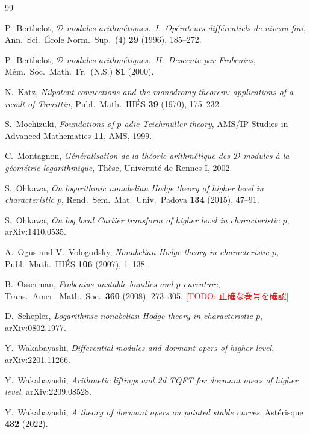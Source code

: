 \documentclass[a4paper,11pt]{ltjsarticle}
\theoremstyle{plain}
\theoremstyle{definition}
\newcommand{\Todo}[1]{\textcolor{red}{\textsf{[TODO: #1]}}}
\begin{document}
\begin{thebibliography}{99}

 P.~Berthelot,
\emph{$\mathcal{D}$-modules arithmétiques.\ I.\ Opérateurs différentiels de niveau fini},
Ann.\ Sci.\ École Norm.\ Sup.\ (4) \textbf{29} (1996), 185--272.

 P.~Berthelot,
\emph{$\mathcal{D}$-modules arithmétiques.\ II.\ Descente par Frobenius},
Mém.\ Soc.\ Math.\ Fr.\ (N.S.) \textbf{81} (2000).

 N.~Katz,
\emph{Nilpotent connections and the monodromy theorem: applications of a result of Turrittin},
Publ.\ Math.\ IHÉS \textbf{39} (1970), 175--232.

 S.~Mochizuki,
\emph{Foundations of $p$-adic Teichmüller theory},
AMS/IP Studies in Advanced Mathematics \textbf{11}, AMS, 1999.

 C.~Montagnon,
\emph{Généralisation de la théorie arithmétique des $\mathcal{D}$-modules à la géométrie logarithmique},
Thèse, Université de Rennes I, 2002.

 S.~Ohkawa,
\emph{On logarithmic nonabelian Hodge theory of higher level in characteristic $p$},
Rend.\ Sem.\ Mat.\ Univ.\ Padova \textbf{134} (2015), 47--91.

 S.~Ohkawa,
\emph{On log local Cartier transform of higher level in characteristic $p$},
arXiv:1410.0535.

 A.~Ogus and V.~Vologodsky,
\emph{Nonabelian Hodge theory in characteristic $p$},
Publ.\ Math.\ IHÉS \textbf{106} (2007), 1--138.

 B.~Osserman,
\emph{Frobenius-unstable bundles and $p$-curvature},
Trans.\ Amer.\ Math.\ Soc.\ \textbf{360} (2008), 273--305.
\Todo{正確な巻号を確認}

 D.~Schepler,
\emph{Logarithmic nonabelian Hodge theory in characteristic $p$},
arXiv:0802.1977.

 Y.~Wakabayashi,
\emph{Differential modules and dormant opers of higher level},
arXiv:2201.11266.

 Y.~Wakabayashi,
\emph{Arithmetic liftings and 2d TQFT for dormant opers of higher level},
arXiv:2209.08528.

 Y.~Wakabayashi,
\emph{A theory of dormant opers on pointed stable curves},
Astérisque \textbf{432} (2022).

\end{thebibliography}
\end{document}
